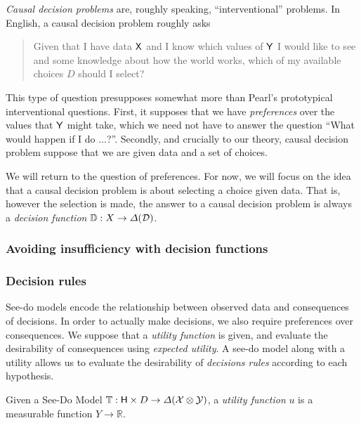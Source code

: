 \emph{Causal decision problems} are, roughly speaking, ``interventional'' problems. In English, a causal decision problem roughly asks

\begin{quote}
    Given that I have data $\mathsf{X}$ and I know which values of $\mathsf{Y}$ I would like to see and some knowledge about how the world works, which of my available choices $D$ should I select?
\end{quote}

This type of question presupposes somewhat more than Pearl's prototypical interventional questions. First, it supposes that we have \emph{preferences} over the values that $\mathsf{Y}$ might take, which we need not have to answer the question ``What would happen if I do ...?''. Secondly, and crucially to our theory, causal decision problem suppose that we are given data and a set of choices. 

We will return to the question of preferences. For now, we will focus on the idea that a causal decision problem is about selecting a choice given data. That is, however the selection is made, the answer to a causal decision problem is always a \emph{decision function} $\mathbb{D}:X\to \Delta(\mathcal{D})$.

\subsubsection{Avoiding insufficiency with decision functions}


\subsubsection{Decision rules}

See-do models encode the relationship between observed data and consequences of decisions. In order to actually make decisions, we also require preferences over consequences. We suppose that a \emph{utility function} is given, and evaluate the desirability of consequences using \emph{expected utility}. A see-do model along with a utility allows us to evaluate the desirability of \emph{decisions rules} according to each hypothesis.

\begin{definition}
Given a See-Do Model $\mathbb{T}:\mathsf{H}\times D\to \Delta(\mathcal{X}\otimes\mathcal{Y})$, a \emph{utility function} $u$ is a measurable function $Y\to \mathbb{R}$. 
\end{definition}

